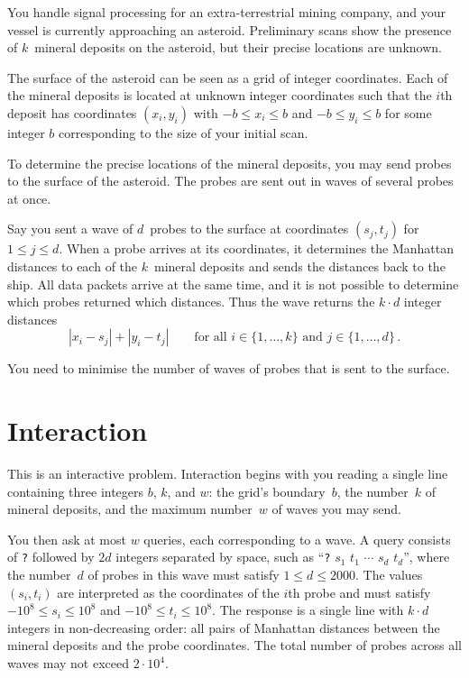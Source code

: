 

\noindent
You handle signal processing for an extra-terrestrial mining company, and your vessel is currently approaching an asteroid. 
Preliminary scans show the presence of $k$~mineral deposits on the asteroid, but their precise locations are unknown.

\medskip

The surface of the asteroid can be seen as a grid of integer coordinates.
Each of the mineral deposits is located at unknown integer coordinates such that the $i$th deposit has coordinates $(x_i, y_i)$ with  
$-b \le x_i \le b$ and $-b\le y_i \le b$ %
for some integer $b$ corresponding to the size of your initial scan.

To determine the precise locations of the mineral deposits, you may send probes to the surface of the asteroid. 
The probes are sent out in waves of several probes at once.

Say you sent a wave of $d$~probes to the surface at coordinates $(s_j,t_j)$ for $1\leq j\leq d$.
When a probe arrives at its coordinates, it determines the Manhattan distances to each of the $k$~mineral deposits and sends the distances back to the ship. 
All data packets arrive at the same time, and it is not possible to determine which probes returned which distances. 
Thus the wave returns the $k\cdot d$ integer distances
\[|x_i-s_j| + |y_i - t_j| \qquad\text{for all } i \in \{1,\ldots,k\} \text{ and } j \in\{ 1,\ldots,d\}\,.\]

You need to minimise the number of waves of probes that is sent to the surface.


\section*{Interaction}

This is an interactive problem.
Interaction begins with you reading a single line containing three integers $b$, $k$, and $w$:
the grid's boundary~$b$,
the number~$k$ of mineral deposits,
and the maximum number~$w$ of waves you may send.

You then ask at most $w$ queries, each corresponding to a wave.
A query consists of \texttt{?} followed by $2d$ integers separated by space, such as ``\texttt{?} $s_1$ $t_1$ $\cdots$ $s_d$ $t_d$'', where the number~$d$ of probes in this wave must satisfy
$1\leq d\leq 2000$. %
The values $(s_i,t_i)$ are interpreted as the coordinates of the $i$th probe and must satisfy
$-10^8 \leq s_i \leq 10^8$ and $-10^8 \leq t_i \leq 10^8$. %
The response is a single line with $k \cdot d$ integers in non-decreasing order: all pairs of Manhattan distances between the mineral deposits and the probe coordinates.
The total number of probes across all waves may not exceed
$2\cdot 10^4.$ %

